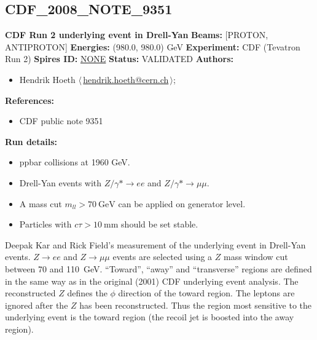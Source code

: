 \subsection{CDF\_2008\_NOTE\_9351}
\textbf{CDF Run 2 underlying event in Drell-Yan}\newline
\textbf{Beams:} [PROTON, ANTIPROTON] \newline
\textbf{Energies:} (980.0, 980.0) GeV \newline
\textbf{Experiment:} CDF (Tevatron Run 2) \newline
\textbf{Spires ID:} \href{http://www.slac.stanford.edu/spires/find/hep/www?rawcmd=key+NONE}{NONE}\newline
\textbf{Status:} VALIDATED\newline
\textbf{Authors:}
\begin{itemize}
  \item Hendrik Hoeth $\langle\,$\href{mailto:hendrik.hoeth@cern.ch}{hendrik.hoeth@cern.ch}$\,\rangle$;
\end{itemize}
\textbf{References:}
\begin{itemize}
  \item CDF public note 9351
\end{itemize}
\textbf{Run details:}
\begin{itemize}

  \item ppbar collisions at 1960 GeV.
  \item Drell-Yan events with $Z/\gamma* \ensuremath{\to} e e$ and $Z/\gamma* \ensuremath{\to} \mu\mu$.
  \item A mass cut $m_{ll} > 70~\text{GeV}$ can be applied on generator level.
  \item Particles with $c \tau > 10~\text{mm}$ should be set stable.\end{itemize}

\noindent Deepak Kar and Rick Field's measurement of the underlying event in Drell-Yan events. $Z \ensuremath{\to} ee$ and $Z \ensuremath{\to} \mu\mu$ events are selected using a $Z$ mass window cut between 70 and 110~GeV. ``Toward'', ``away'' and ``transverse'' regions are defined in the same way as in the original (2001) CDF underlying event analysis. The reconstructed $Z$ defines the $\phi$ direction of the toward region. The leptons are ignored after the $Z$ has been reconstructed. Thus the region most sensitive to the underlying event is the toward region (the recoil jet is boosted into the away region).

